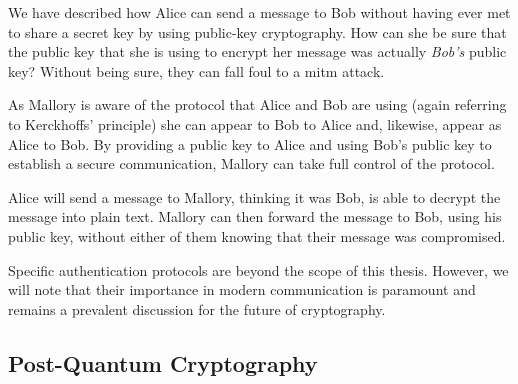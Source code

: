 We have described how Alice can send a message to Bob without having ever met to share a secret key by using public-key cryptography. How can she be sure that the public key that she is using to encrypt her message was actually \emph{Bob's} public key? Without being sure, they can fall foul to a \ac{mitm} attack.

As Mallory is aware of the protocol that Alice and Bob are using (again referring to Kerckhoffs' principle) she can appear to Bob to Alice and, likewise, appear as Alice to Bob. By providing a public key to Alice and using Bob's public key to establish a secure communication, Mallory can take full control of the protocol. 

Alice will send a message to Mallory, thinking it was Bob, is able to decrypt the message into plain text. Mallory can then forward the message to Bob, using his public key, without either of them knowing that their message was compromised. 

Specific authentication protocols are beyond the scope of this thesis. However, we will note that their importance in modern communication is paramount and remains a prevalent discussion for the future of cryptography. 






\subsection{Post-Quantum Cryptography}

